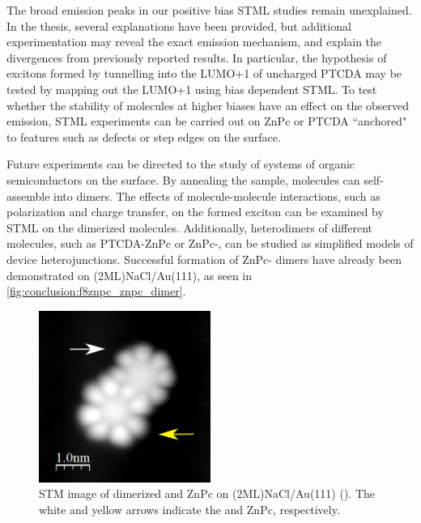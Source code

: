 The broad emission peaks in our positive bias \ac{STML} studies remain unexplained. In the thesis, several explanations have been provided, but additional experimentation may reveal the exact emission mechanism, and explain the divergences from previously reported results. In particular, the hypothesis of excitons formed by tunnelling into the LUMO+1 of uncharged \ac{PTCDA} may be tested by mapping out the LUMO+1 using bias dependent \ac{STML}. To test whether the stability of molecules at higher biases have an effect on the observed emission, \ac{STML} experiments can be carried out on \ac{ZnPc} or \ac{PTCDA} ``anchored" to features such as defects or step edges on the surface. 

Future experiments can be directed to the study of systems of organic semiconductors on the surface. By annealing the sample, molecules can self-assemble into dimers. The effects of molecule-molecule interactions, such as polarization and charge transfer, on the formed exciton can be examined by \ac{STML} on the dimerized molecules. Additionally, heterodimers of different molecules, such as PTCDA-ZnPc or ZnPc-, can be studied as simplified models of device heterojunctions. Successful formation of ZnPc- dimers have already been demonstrated on (2ML)NaCl/Au(111), as seen in \autoref{fig:conclusion:f8znpc_znpc_dimer}. 

\begin{figure}[H]
    \centering
    \includegraphics[width=0.5\textwidth]{pictures/f8znpc_znpc_dimer_arrows.png}
    \caption{\sloppy STM image of dimerized  and ZnPc on (2ML)NaCl/\-Au(111) (). The white and yellow arrows indicate the  and ZnPc, respectively.}
    \label{fig:conclusion:f8znpc_znpc_dimer}
\end{figure}

